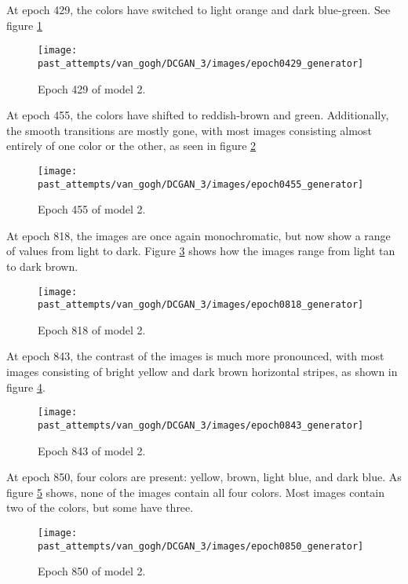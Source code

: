 \documentclass[11pt,letterpaper]{article}
\begin{document}
				At epoch 429, the colors have switched to light orange and dark blue-green.
				See figure \ref{fig:cgvg:epoch0429generator}
				\begin{figure}
					\centering
					\texttt{[image: past\_attempts/van\_gogh/DCGAN\_3/images/epoch0429\_generator]}
					\caption{Epoch 429 of model 2.}
					\label{fig:cgvg:epoch0429generator}
				\end{figure}

				At epoch 455, the colors have shifted to reddish-brown and green.
				Additionally, the smooth transitions are mostly gone, with most images consisting almost entirely of one color or the other, as seen in figure \ref{fig:cgvg:epoch0455generator}
				\begin{figure}
					\centering
					\texttt{[image: past\_attempts/van\_gogh/DCGAN\_3/images/epoch0455\_generator]}
					\caption{Epoch 455 of model 2.}
					\label{fig:cgvg:epoch0455generator}
				\end{figure}

				At epoch 818, the images are once again monochromatic, but now show a range of values from light to dark.
				Figure \ref{fig:cgvg:epoch0818generator} shows how the images range from light tan to dark brown.
				\begin{figure}
					\centering
					\texttt{[image: past\_attempts/van\_gogh/DCGAN\_3/images/epoch0818\_generator]}
					\caption{Epoch 818 of model 2.}
					\label{fig:cgvg:epoch0818generator}
				\end{figure}

				At epoch 843, the contrast of the images is much more pronounced, with most images consisting of bright yellow and dark brown horizontal stripes, as shown in figure \ref{fig:cgvg:epoch0843generator}.
				\begin{figure}
					\centering
					\texttt{[image: past\_attempts/van\_gogh/DCGAN\_3/images/epoch0843\_generator]}
					\caption{Epoch 843 of model 2.}
					\label{fig:cgvg:epoch0843generator}
				\end{figure}

				At epoch 850, four colors are present: yellow, brown, light blue, and dark blue.
				As figure \ref{fig:cgvg:epoch0850generator} shows, none of the images contain all four colors.
				Most images contain two of the colors, but some have three.
				\begin{figure}
					\centering
					\texttt{[image: past\_attempts/van\_gogh/DCGAN\_3/images/epoch0850\_generator]}
					\caption{Epoch 850 of model 2.}
					\label{fig:cgvg:epoch0850generator}
				\end{figure}
\end{document}
